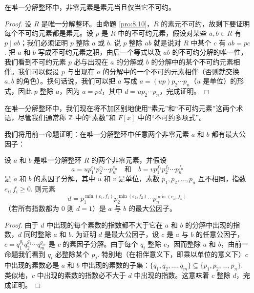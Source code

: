 \begin{proposition}\label{pro:8.12}
在唯一分解整环中，非零元素是素元当且仅当它不可约。
\end{proposition}

\begin{proof}
设 \(R\) 是唯一分解整环。由命题 \ref{pro:8.10}，\(R\) 的素元不可约，故剩下要证明每个不可约元素都是素元。设 \(p\) 是 \(R\) 中的不可约元素，假设对某些 \(a, b \in R\) 有 \(p \mid ab\)；我们必须证明 \(p\) 整除 \(a\) 或 \(b\). 说 \(p\) 整除 \(ab\) 就是说对 \(R\) 中某个 \(c\) 有 \(ab = pc\). 把 \(a\) 和 \(b\) 写成不可约元素之积，由后一个等式以及 \(ab\) 的不可约分解的唯一性，我们看到不可约元素 \(p\) 必与出现在 \(a\) 的分解或 \(b\) 的分解中的某个不可约元素相伴。我们可以假设 \(p\) 与出现在 \(a\) 的分解中的一个不可约元素相伴（否则就交换 \(a, b\) 的角色）。换句话说，我们可以把 \(a\) 写成 \(a = (up)p_2\cdots p_n\)（\(u\) 是单位）的形式，因此 \(p\) 整除 \(a\)，因为 \(a = pd\)，其中 \(d = up_2\cdots p_n\)，完成证明。
\end{proof}

在唯一分解整环中，我们现在将不加区别地使用“素元”和“不可约元素”这两个术语，尽管我们通常称 \(\mathbb{Z}\) 中的“素数”和 \(F[x]\) 中的“不可约多项式”。

我们将用前一命题证明：在唯一分解整环中任意两个非零元素 \(a\) 和 \(b\) 都有最大公因子：

\begin{proposition}\label{pro:8.13}
设 \(a\) 和 \(b\) 是唯一分解整环 \(R\) 的两个非零元素，并假设
\[
a = up_1^{e_1}p_2^{e_2}\cdots p_n^{e_n} \quad \text{和} \quad b = vp_1^{f_1}p_2^{f_2}\cdots p_n^{f_n}
\]
是 \(a\) 和 \(b\) 的素因子分解，其中 \(u\) 和 \(v\) 是单位，素数 \(p_1, p_2, \ldots, p_n\) 互不相同，指数 \(e_i, f_i \geq 0\). 则元素
\[
d = p_1^{\min(e_1, f_1)}p_2^{\min(e_2, f_2)}\cdots p_n^{\min(e_n, f_n)}
\]
（若所有指数都为 0 则 \(d = 1\)）是 \(a\) 与 \(b\) 的最大公因子。
\end{proposition}

\begin{proof}
由于 \(d\) 中出现的每个素数的指数都不大于它在 \(a\) 和 \(b\) 的分解中出现的指数，\(d\) 同时整除 \(a\) 和 \(b\). 为证明 \(d\) 是最大公因子，设 \(c\) 是 \(a\) 与 \(b\) 的任意公因子，\(c = q_1^{g_1}q_2^{g_2}\cdots q_m^{g_m}\) 是 \(c\) 的素因子分解。由于每个 \(q_i\) 整除 \(c\)，因而整除 \(a\) 和 \(b\)，由前一命题我们看到 \(q_i\) 必整除某个 \(p_j\). 特别地（在相伴意义下，即乘以单位的意义下）\(c\) 中出现的素数必是 \(a\) 和 \(b\) 中出现的素数的子集：\(\{q_1, q_2, \ldots, q_m\} \subseteq \{p_1, p_2, \ldots, p_n\}\). 类似地，\(c\) 中出现的素数的指数必不大于 \(d\) 中出现的指数。这意味着 \(c\) 整除 \(d\)，完成证明。
\end{proof}

